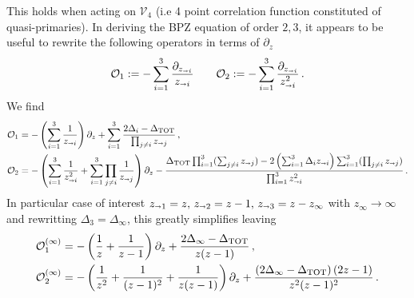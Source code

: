 \documentclass[a4paper]{article}
\begin{document}
This holds when acting on $\mathcal{V}_{4}$ (i.e 4 point correlation function constituted of quasi-primaries). In deriving the BPZ equation of order $2,3$, it appears to be useful to rewrite the following operators in terms of $\partial_z$
\begin{equation}
  \mathcal{O}_1 :=-\sum_{i=1}^{3}\frac{\partial_{z_{\shortrightarrow i}}}{z_{\shortrightarrow i}}  \qquad \mathcal{O}_2  :=-\sum_{i=1}^{3}\frac{\partial_{z_{\shortrightarrow i}}}{z^2_{\shortrightarrow i}} \,.
\end{equation}
We find
\begin{equation}
  \begin{aligned}
    \mathcal{O}_1  &= -\left(\sum_{i=1}^{3}\frac{1}{z_{\shortrightarrow i}}\right)\partial_z + \sum_{i=1}^{3}\frac{2\Delta_i -\Delta_{\rm TOT}}{\prod_{j\neq i}z_{\shortrightarrow j}}\,,\\
    \mathcal{O}_2  &= -\left(\sum_{i=1}^3 \frac{1}{z_{\shortrightarrow i}^2} +\sum_{i=1}^3 \prod_{j \neq i}\frac{1}{z_{\shortrightarrow j}}\right)\partial_z-\frac{\Delta_{\rm TOT}\prod_{i=1}^{3}(\sum_{j \neq i} z_{\shortrightarrow j})- 2\left(\sum_{i=1}^{3}\Delta_i z_{\shortrightarrow i}\right)\sum_{i=1}^{3}(\prod_{j \neq i} z_{\shortrightarrow j})}{\prod_{i=1}^{3}z_{\shortrightarrow i}^2}\,.
  \end{aligned}
\end{equation}
In particular case of interest $z_{\shortrightarrow 1}=z,\,z_{\shortrightarrow 2}=z-1,\,z_{\shortrightarrow 3} = z-z_{\infty}$ with $z_{\infty}\to \infty$ and rewritting $\Delta_3 = \Delta_{\infty}$, this greatly simplifies leaving
\begin{equation}\label{eq:veryuseful}
  \begin{aligned}
    \mathcal{O}^{(\infty)}_1  &= -\left(\frac{1}{z}+\frac{1}{z-1}\right)\partial_z +\frac{2\Delta_{\infty} -\Delta_{\rm TOT}}{z(z-1)}\,,\\
    \mathcal{O}^{(\infty)}_2  &= -\left(\frac{1}{z^2}+\frac{1}{(z-1)^2}+\frac{1}{z(z-1)}\right)\partial_z+\frac{\left(2\Delta_{\infty}-\Delta_{\rm TOT}\right)(2z-1)}{z^2(z-1)^2}\,.
  \end{aligned}
\end{equation}
\end{document}
